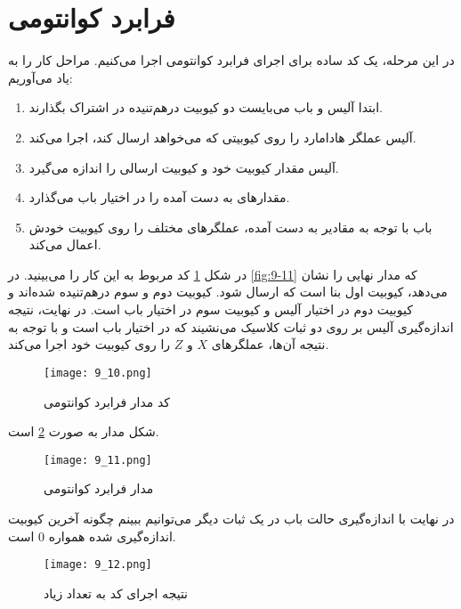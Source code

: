 \section{فرابرد کوانتومی}
در این مرحله، یک کد ساده برای اجرای فرابرد کوانتومی اجرا می‌کنیم. مراحل کار را به یاد می‌آوریم:
\begin{enumerate}
	\item ابتدا آلیس و باب می‌بایست دو کیوبیت درهم‌تنیده در اشتراک بگذارند.
	\item آلیس عملگر هادامارد را روی کیوبیتی که می‌خواهد ارسال کند، اجرا می‌کند. 
	\item آلیس مقدار کیوبیت خود و کیوبیت ارسالی را اندازه می‌گیرد. 
	\item  مقدارهای به دست آمده را در اختیار باب می‌گذارد.
	\item باب با توجه به مقادیر به دست آمده، عملگرهای مختلف را روی کیوبیت خودش اعمال می‌کند.
\end{enumerate}
در شکل \ref{fig:9-10} کد مربوط به این کار را می‌بینید. در \autoref{fig:9-11} که مدار نهایی را نشان می‌دهد، کیوبیت اول بنا است که ارسال شود. کیوبیت دوم و سوم در‌هم‌تنیده شده‌اند و کیوبیت دوم در اختیار آلیس و کیوبیت سوم در اختیار باب است. در نهایت، نتیجه اندازه‌گیری آلیس بر روی دو ثبات کلاسیک می‌نشیند که در اختیار باب است و با توجه به نتیجه آن‌ها، عملگرهای $X$ و $Z$ را روی کیوبیت خود اجرا می‌کند. 
\begin{figure}[h]
	\caption{کد مدار فرابرد کوانتومی}
	\centering
	\texttt{[image: 9\_10.png]}
	\label{fig:9-10}
\end{figure}
شکل مدار به صورت \ref{fig:9-11} است. 

\begin{figure}[h]
	\caption{ مدار فرابرد کوانتومی}
	\centering
	\texttt{[image: 9\_11.png]}
	\label{fig:9-11}
\end{figure}
در نهایت با اندازه‌گیری حالت باب در یک ثبات دیگر می‌توانیم ببینم چگونه آخرین کیوبیت اندازه‌گیری شده همواره $0$ است. 
\begin{figure}[h]
	\caption{نتیجه اجرای کد به تعداد زیاد}
	\centering
	\texttt{[image: 9\_12.png]}
	\label{fig:9-12}
\end{figure}

